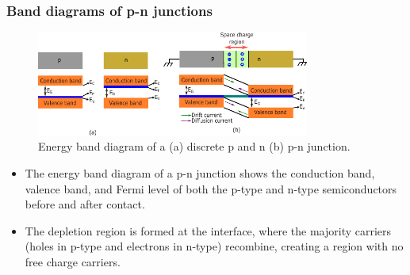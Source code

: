 \begin{frame}
    \frametitle{Band diagrams of p-n junctions}
	\begin{figure}
		\centering
		\includegraphics[width=0.8\textwidth]{fig/lec03/Band_diagram_all.pdf}
		\caption{Energy band diagram of a (a) discrete p and n (b) p-n junction.}
		\label{fig:pn_junction_all}
	\end{figure}
	\vspace{-0.5cm}
	\begin{itemize}
		\item The energy band diagram of a p-n junction shows the conduction band, valence band, and Fermi level of both the p-type and n-type semiconductors before and after contact.
		\item The depletion region is formed at the interface, where the majority carriers (holes in p-type and electrons in n-type) recombine, creating a region with no free charge carriers.
	\end{itemize}
\end{frame}


